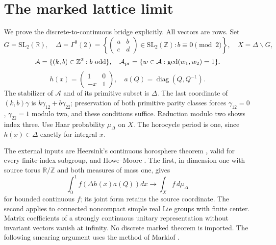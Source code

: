 \documentclass[11pt,a4paper]{article}
\numberwithin{equation}{section}
\theoremstyle{remark}
\newcommand{\Z}{\mathbb Z}
\begin{document}
\section{The marked lattice limit}\label{sec:bridge}
We prove the discrete-to-continuous bridge explicitly. All vectors are
rows. Set
\[
G=\mathrm{SL}_2(\mathbb R),\quad
\Delta=\Gamma^0(2)=\left\{\begin{pmatrix}a&b\\c&d\end{pmatrix}
\in\mathrm{SL}_2(\Z):b\equiv0\pmod2\right\},\quad X=\Delta\backslash G,
\]
\[
\mathcal A=\{(k,b)\in\Z^2:b\text{ odd}\},\quad
\mathcal A_{\rm pr}=\{w\in\mathcal A:\gcd(w_1,w_2)=1\}.
\]
\[
h(x)=\begin{pmatrix}1&0\\-x&1\end{pmatrix},\quad
a(Q)=\operatorname{diag}(Q,Q^{-1}).
\]
The stabilizer of $\mathcal A$ and of its primitive subset is
$\Delta$. The last coordinate of $(k,b)\gamma$ is
$k\gamma_{12}+b\gamma_{22}$; preservation of both primitive parity
classes forces $\gamma_{12}=0$, $\gamma_{22}=1$ modulo two, and these
conditions suffice. Reduction modulo two shows index three.
Use Haar probability $\mu_\Delta$ on $X$. The horocycle period is
one, since $h(x)\in\Delta$ exactly for integral $x$.

The external inputs are Heersink's continuous horosphere theorem
\cite[\S2, pp.~3--4; Theorem~4, p.~7]{Heersink}, valid for every
finite-index subgroup, and Howe--Moore
\cite[Theorem~1.1, p.~2; Definition~2.6, p.~4]{Ciobotaru}.
The first, in dimension one with source torus $\mathbb R/\mathbb Z$
and both measures of mass one, gives
\begin{equation}\label{eq:continuous}
\int_0^1f(\Delta h(x)a(Q))dx\longrightarrow\int_Xf\,d\mu_\Delta
\end{equation}
for bounded continuous $f$; its joint form retains the source coordinate.
The second applies to connected noncompact simple real Lie groups
with finite center. Matrix coefficients of a strongly continuous
unitary representation without invariant vectors vanish at infinity.
No discrete marked theorem is imported. The following smearing argument
uses the method of Marklof
\cite[\S4, Proposition~9, equations~(4.8)--(4.13)]{MarklofSmall}.
\end{document}
